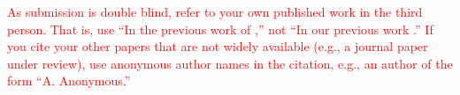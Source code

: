 \documentclass{article}
\begin{document}
\textcolor{red}{As submission is double blind, refer to your own published work in the third person. That is, use ``In the previous work of \cite{Someone:10},'' not ``In our previous work \cite{Someone:10}.'' If you cite your other papers that are not widely available (e.g., a journal paper under review), use anonymous author names in the citation, e.g., an author of the form ``A. Anonymous.''}



%
%
%
%
\end{document}
